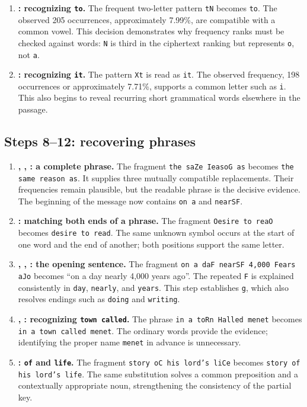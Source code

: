 \begin{enumerate}
\item \textbf{: recognizing \texttt{to}.} The frequent two-letter pattern \texttt{tN} becomes \texttt{to}. The observed 205 occurrences, approximately 7.99\%, are compatible with a common vowel. This decision demonstrates why frequency ranks must be checked against words: \texttt{N} is third in the ciphertext ranking but represents \texttt{o}, not \texttt{a}.

\item \textbf{: recognizing \texttt{it}.} The pattern \texttt{Xt} is read as \texttt{it}. The observed frequency, 198 occurrences or approximately 7.71\%, supports a common letter such as \texttt{i}. This also begins to reveal recurring short grammatical words elsewhere in the passage.
\end{enumerate}

\subsection{Steps 8--12: recovering phrases}
\begin{enumerate}[resume]
\item \textbf{, , : a complete phrase.} The fragment \texttt{the saZe IeasoG as} becomes \texttt{the same reason as}. It supplies three mutually compatible replacements. Their frequencies remain plausible, but the readable phrase is the decisive evidence. The beginning of the message now contains \texttt{on a} and \texttt{nearSF}.

\item \textbf{: matching both ends of a phrase.} The fragment \texttt{Oesire to reaO} becomes \texttt{desire to read}. The same unknown symbol occurs at the start of one word and the end of another; both positions support the same letter.

\item \textbf{, , : the opening sentence.} The fragment \texttt{on a daF nearSF 4,000 Fears aJo} becomes ``on a day nearly 4,000 years ago''. The repeated \texttt{F} is explained consistently in \texttt{day}, \texttt{nearly}, and \texttt{years}. This step establishes \texttt{g}, which also resolves endings such as \texttt{doing} and \texttt{writing}.

\item \textbf{, : recognizing \texttt{town called}.} The phrase \texttt{in a toRn Halled menet} becomes \texttt{in a town called menet}. The ordinary words provide the evidence; identifying the proper name \texttt{menet} in advance is unnecessary.

\item \textbf{: \texttt{of} and \texttt{life}.} The fragment \texttt{story oC his lord's liCe} becomes \texttt{story of his lord's life}. The same substitution solves a common preposition and a contextually appropriate noun, strengthening the consistency of the partial key.
\end{enumerate}

